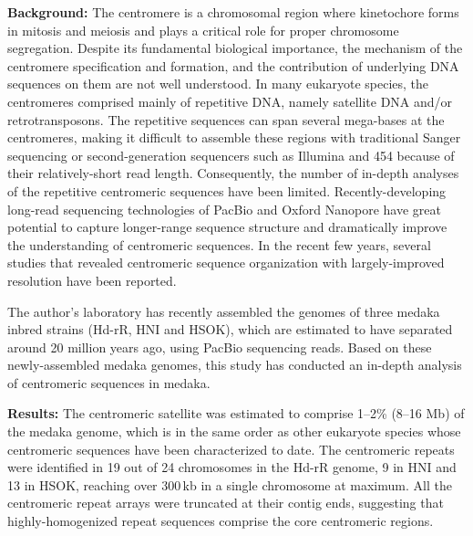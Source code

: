 \noindent\textbf{Background:} The centromere is a chromosomal region where kinetochore forms in mitosis and meiosis and plays a critical role for proper chromosome segregation. Despite its fundamental biological importance, the mechanism of the centromere specification and formation, and the contribution of underlying DNA sequences on them are not well understood. In many eukaryote species, the centromeres comprised mainly of repetitive DNA, namely satellite DNA and/or retrotransposons. The repetitive sequences can span several mega-bases at the centromeres, making it difficult to assemble these regions with traditional Sanger sequencing or second-generation sequencers such as Illumina and 454 because of their relatively-short read length. Consequently, the number of in-depth analyses of the repetitive centromeric sequences have been limited. Recently-developing long-read sequencing technologies of PacBio and Oxford Nanopore have great potential to capture longer-range sequence structure and dramatically improve the understanding of centromeric sequences. In the recent few years, several studies that revealed centromeric sequence organization with largely-improved resolution have been reported.

The author's laboratory has recently assembled the genomes of three medaka inbred strains (Hd-rR, HNI and HSOK), which are estimated to have separated around 20 million years ago, using PacBio sequencing reads. Based on these newly-assembled medaka genomes, this study has conducted an in-depth analysis of centromeric sequences in medaka.

\vspace{0.7cm}
\noindent\textbf{Results:} The centromeric satellite was estimated to comprise 1--2\% (8--16 Mb) of the medaka genome, which is in the same order as other eukaryote species whose centromeric sequences have been characterized to date. The centromeric repeats were identified in 19 out of 24 chromosomes in the Hd-rR genome, 9 in HNI and 13 in HSOK, reaching over 300\,kb in a single chromosome at maximum. All the centromeric repeat arrays were truncated at their contig ends, suggesting that highly-homogenized repeat sequences comprise the core centromeric regions.

